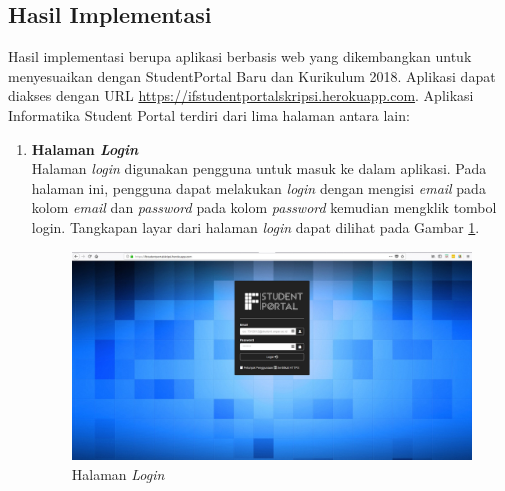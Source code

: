 \subsection{Hasil Implementasi}
		Hasil implementasi berupa aplikasi berbasis web yang dikembangkan untuk menyesuaikan dengan StudentPortal Baru dan Kurikulum 2018. Aplikasi dapat diakses dengan URL \url{https://ifstudentportalskripsi.herokuapp.com}. Aplikasi Informatika Student Portal terdiri dari lima halaman antara lain:
		\begin{enumerate}
			\item\textbf{Halaman \textit{Login}}\\
				Halaman \textit{login} digunakan pengguna untuk masuk ke dalam aplikasi. Pada halaman ini, pengguna dapat melakukan \textit{login} dengan mengisi \textit{email} pada kolom \textit{email} dan \textit{password} pada kolom \textit{password} kemudian mengklik tombol login. Tangkapan layar dari halaman \textit{login} dapat dilihat pada Gambar \ref{fig:5_halaman_login}.
					\begin{figure}[H]
						\centering
						\includegraphics[scale=0.34]{Gambar/halaman_login}
						\caption{Halaman \textit{Login}} 
						\label{fig:5_halaman_login}
					\end{figure}
					

\end{enumerate}
